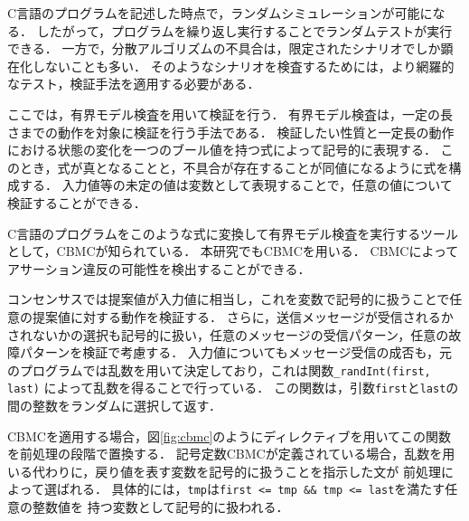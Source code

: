 \documentclass[technicalreport]{ieicej}
\theoremstyle{plain}
\begin{document}
C言語のプログラムを記述した時点で，ランダムシミュレーションが可能になる．
したがって，プログラムを繰り返し実行することでランダムテストが実行できる．
一方で，分散アルゴリズムの不具合は，限定されたシナリオでしか顕在化しないことも多い．
そのようなシナリオを検査するためには，より網羅的なテスト，検証手法を適用する必要がある．

ここでは，有界モデル検査を用いて検証を行う．
有界モデル検査は，一定の長さまでの動作を対象に検証を行う手法である．
検証したい性質と一定長の動作における状態の変化を一つのブール値を持つ式によって記号的に表現する．
このとき，式が真となることと，不具合が存在することが同値になるように式を構成する．
入力値等の未定の値は変数として表現することで，任意の値について検証することができる．

C言語のプログラムをこのような式に変換して有界モデル検査を実行するツールとして，CBMCが知られている\cite{ckl2004}．
本研究でもCBMCを用いる．
CBMCによってアサーション違反の可能性を検出することができる．


コンセンサスでは提案値が入力値に相当し，これを変数で記号的に扱うことで任意の提案値に対する動作を検証する．
さらに，送信メッセージが受信されるかされないかの選択も記号的に扱い，任意のメッセージの受信パターン，任意の故障パターンを検証で考慮する．
入力値についてもメッセージ受信の成否も，元のプログラムでは乱数を用いて決定しており，これは関数\verb|_randInt(first, last)|
によって乱数を得ることで行っている．
この関数は，引数\verb|first|と\verb|last|の間の整数をランダムに選択して返す．

CBMCを適用する場合，図\ref{fig:cbmc}のようにディレクティブを用いてこの関数を前処理の段階で置換する．
記号定数CBMCが定義されている場合，乱数を用いる代わりに，戻り値を表す変数を記号的に扱うことを指示した文が
前処理によって選ばれる．
具体的には，\verb|tmp|は\verb|first <= tmp && tmp <= last|を満たす任意の整数値を
持つ変数として記号的に扱われる．
\end{document}
